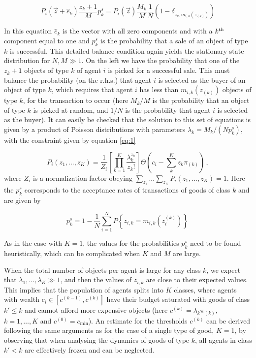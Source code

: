 \begin{equation}
\label{Eq:MasterEq3_2Goods_1Guy}
P_i(\vec z+\hat e_k)\frac{z_k+1}{M}p^s_{k}=
P_i(\vec z)  \frac{M_k}{M} \frac{1}{N} \left(1-\delta_{z_k,m_{i,k}(z_{(k)})}\right) 
\end{equation}

In this equation $\hat e_k$ is the vector with all zero components and with a $k^{\rm th}$ component equal to one and $p^s_{k}$ is the probability that a sale of an object of type $k$ is successful. This detailed balance condition again yields the stationary state distribution for $N,M\gg 1$. On the left we have the probability that one of the $z_k+1$ objects of type $k$ of agent $i$ is picked for a successful sale. This must balance the probability (on the r.h.s.) that agent $i$ is selected as the buyer of an object of type $k$, which requires that agent $i$ has less than $m_{i,k}(z_{(k)})$ objects of type $k$, for the transaction to occur (here $M_k/M$ is the probability that an object of type $k$ is picked at random, and $1/N$ is the probability that agent $i$ is selected as the buyer). It can easily be checked that the solution to this set of equations is given by a product of Poisson distributions with parameters $\lambda_k=M_k/(N p^s_{k})$, with the constraint given by equation \eqref{eq:1}

\begin{equation}
P_i(z_1,..., z_{K}) = \frac{1}{Z_i} \left[ \prod_{k=1}^{K}\frac{\lambda^{z_k}_k}{z_k!}\right] \Theta\left(c_i - \sum_k^{K} z_k \pi_{(k)}\right)\,,
\label{Eq:ME_solution_2Goods}
\end{equation}
where $Z_i$ is a normalization factor obeying $\sum_{z_1}...  \sum_{z_{K}}  P_i(z_1, ..., z_{K}) = 1$. Here the $p_k^s$ corresponds to the acceptance rates of transactions of goods of class $k$ and are given by

\begin{equation}
p^s_{k} = 1 - \frac{1}{N}\sum_{i=1}^N P\left\{z_{i,k}=m_{i,k}(z_i^{(k)})\right\}\,
\label{eq:ps_Kobjs}
\end{equation}

As in the case with $K = 1$, the values for the probabilities $p^s_{k}$ need to be found heuristically, which can be complicated when $K$ and $M$ are large.

When the total number of objects per agent is large for any class $k$, we expect that $\lambda_1, ..., \lambda_K \gg 1$, and then the values of $z_{i,k}$ are close to their expected values. This implies that the population of agents splits into $K$ classes, where agents with wealth $c_i\in [c^{(k-1)},c^{(k)}]$ have their budget saturated with goods of class $k'\leq k$ and cannot afford more expensive objects (here $c^{(k)}=\lambda_k\pi_{(k)}$, $k=1,\ldots, K$ and $c^{(0)}=c_{\min}$). An estimate for the thresholds $c^{(k)}$ can be derived following the same arguments as for the case of a single type of good, $K=1$, by observing that when analysing the dynamics of goods of type $k$, all agents in class $k'<k$ are effectively frozen and can be neglected.

